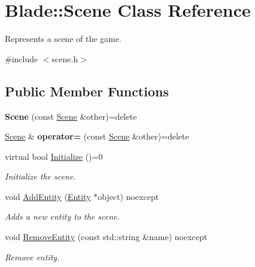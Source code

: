 \hypertarget{class_blade_1_1_scene}{}\section{Blade\+:\+:Scene Class Reference}
\label{class_blade_1_1_scene}


Represents a scene of the game.  




{\ttfamily \#include $<$scene.\+h$>$}

\subsection*{Public Member Functions}
\begin{DoxyCompactItemize}
\item 
\mbox{\label{class_blade_1_1_scene_a80a9bba828a6faf60ca9a91301e6e707}} 
{\bfseries Scene} (const \hyperlink{class_blade_1_1_scene}{Scene} \&other)=delete
\item 
\mbox{\label{class_blade_1_1_scene_ae2d9a202f00b35daf25d8bb7acbb8b16}} 
\hyperlink{class_blade_1_1_scene}{Scene} \& {\bfseries operator=} (const \hyperlink{class_blade_1_1_scene}{Scene} \&other)=delete
\item 
\mbox{\label{class_blade_1_1_scene_a0bd508e8d4ab8db0b91eb8959056bb93}} 
virtual bool \hyperlink{class_blade_1_1_scene_a0bd508e8d4ab8db0b91eb8959056bb93}{Initialize} ()=0
\begin{DoxyCompactList}\small\item\em Initialize the scene. \end{DoxyCompactList}\item 
void \hyperlink{class_blade_1_1_scene_a0f17cd32cb502502fd5a3a39c72b4856}{Add\+Entity} (\hyperlink{class_blade_1_1_entity}{Entity} $\ast$object) noexcept
\begin{DoxyCompactList}\small\item\em Adds a new entity to the scene. \end{DoxyCompactList}\item 
void \hyperlink{class_blade_1_1_scene_ae04a504f28ab2c80099863d067cb6914}{Remove\+Entity} (const std\+::string \&name) noexcept
\begin{DoxyCompactList}\small\item\em Remove entity. \end{DoxyCompactList}\item 

\end{DoxyCompactItemize}
